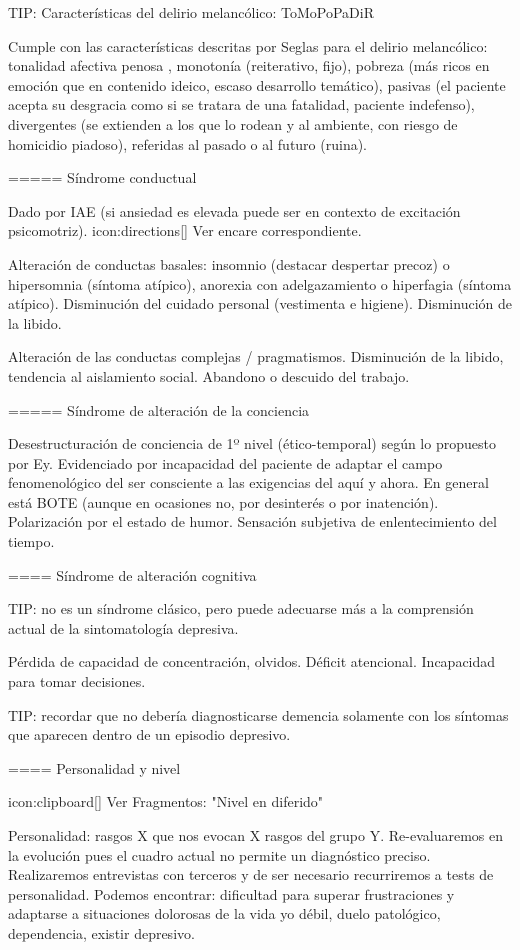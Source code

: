 TIP: Características del delirio melancólico: ToMoPoPaDiR

Cumple con las características descritas por Seglas para el delirio melancólico: tonalidad afectiva penosa , monotonía (reiterativo, fijo), pobreza (más ricos en emoción que en contenido ideico, escaso desarrollo temático), pasivas (el paciente acepta su desgracia como si se tratara de una fatalidad, paciente indefenso), divergentes (se extienden a los que lo rodean y al ambiente, con riesgo de homicidio piadoso), referidas al pasado o al futuro (ruina).

===== Síndrome conductual

Dado por IAE (si ansiedad es elevada puede ser en contexto de excitación psicomotriz). icon:directions[] Ver encare correspondiente.

Alteración de conductas basales: insomnio (destacar despertar precoz) o hipersomnia (síntoma atípico), anorexia con adelgazamiento o hiperfagia (síntoma atípico). Disminución del cuidado personal (vestimenta e higiene). Disminución de la libido.

Alteración de las conductas complejas / pragmatismos. Disminución de la libido, tendencia al aislamiento social. Abandono o descuido del trabajo.

===== Síndrome de alteración de la conciencia

Desestructuración de conciencia de 1º nivel (ético-temporal) según lo propuesto por Ey. Evidenciado por incapacidad del paciente de adaptar el campo fenomenológico del ser consciente a las exigencias del aquí y ahora.
En general está BOTE (aunque en ocasiones no, por desinterés o por inatención). Polarización por el estado de humor.
Sensación subjetiva de enlentecimiento del tiempo.

==== Síndrome de alteración cognitiva

TIP: no es un síndrome clásico, pero puede adecuarse más a la comprensión actual de la sintomatología depresiva.

Pérdida de capacidad de concentración, olvidos. Déficit atencional.
Incapacidad para tomar decisiones.

TIP: recordar que no debería diagnosticarse demencia solamente con los síntomas que aparecen dentro de un episodio depresivo.

==== Personalidad y nivel

icon:clipboard[] Ver Fragmentos: "Nivel en diferido"

Personalidad: rasgos X que nos evocan X rasgos del grupo Y. Re-evaluaremos en la evolución pues el cuadro actual no permite un diagnóstico preciso. Realizaremos entrevistas con terceros y de ser necesario recurriremos a tests de personalidad. Podemos encontrar: dificultad para superar frustraciones y adaptarse a situaciones dolorosas de la vida yo débil, duelo patológico, dependencia, existir depresivo.

